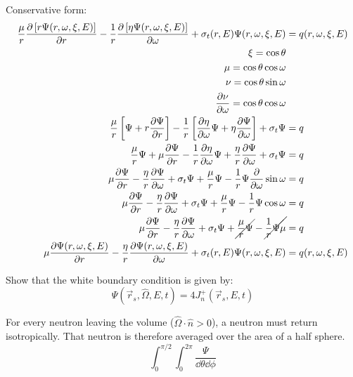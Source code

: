 \documentclass{hw}
\begin{document}
    Conservative form:
    \begin{align*}
    	\frac{\mu}{r} \pdv{\left[ r \Psi( r, \omega, \xi, E ) \right]}{r} - \frac{1}{r} \pdv{\left[ \eta \Psi( r, \omega, \xi, E ) \right]}{\omega} +
    		\sigma_t ( r, E ) \Psi( r, \omega, \xi, E ) &= q(r, \omega, \xi, E) \\
        \xi = \cos{\theta} \\
        \mu = \cos{\theta}\cos{\omega} \\
        \nu = \cos{\theta}\sin{\omega} \\
        \pdv{\nu}{\omega} = \cos{\theta}\cos{\omega} \\
        \frac{\mu}{r} \left[ \Psi + r \pdv{\Psi}{r} \right] - \frac{1}{r} \left[ \pdv{\eta}{\omega} \Psi + \eta \pdv{\Psi}{\omega} \right] + \sigma_t \Psi &= q \\
        \frac{\mu}{r} \Psi + \mu \pdv{\Psi}{r} - \frac{1}{r} \pdv{\eta}{\omega} \Psi + \frac{\eta}{r} \pdv{\Psi}{\omega} + \sigma_t \Psi &= q \\
        \mu \pdv{\Psi}{r} - \frac{\eta}{r} \pdv{\Psi}{\omega} + \sigma_t \Psi + \frac{\mu}{r} \Psi - \frac{1}{r} \Psi \pdv{}{\omega} \sin{\omega} &= q \\
        \mu \pdv{\Psi}{r} - \frac{\eta}{r} \pdv{\Psi}{\omega} + \sigma_t \Psi + \frac{\mu}{r} \Psi - \frac{1}{r} \Psi \cos{\omega} &= q \\
        \mu \pdv{\Psi}{r} - \frac{\eta}{r} \pdv{\Psi}{\omega} + \sigma_t \Psi + \cancel{\frac{\mu}{r} \Psi} - \cancel{\frac{1}{r} \Psi \mu} &= q \\
        \mu \pdv{\Psi(r, \omega, \xi, E)}{r} - \frac{\eta}{r} \pdv{\Psi(r, \omega, \xi, E)}{\omega} + \sigma_t(r, E) \Psi(r, \omega, \xi, E) &= q(r, \omega, \xi, E)
    \end{align*}

\problem{}
    Show that the white boundary condition is given by: $$ \Psi(\vec{r}_s, \hat{\Omega}, E, t) = 4 J^+_n(\vec{r}_s, E, t) $$

\solution
    For every neutron leaving the volume ($\hat{\Omega}\cdot \hat{n} > 0$), a neutron must return isotropically. That neutron is 
    therefore averaged over the area of a half sphere. 
    $$
        \int_0^{\pi / 2} \int_0^{2 \pi} \frac{\Psi}{\dd \theta \dd \phi}
    $$
\end{document}
